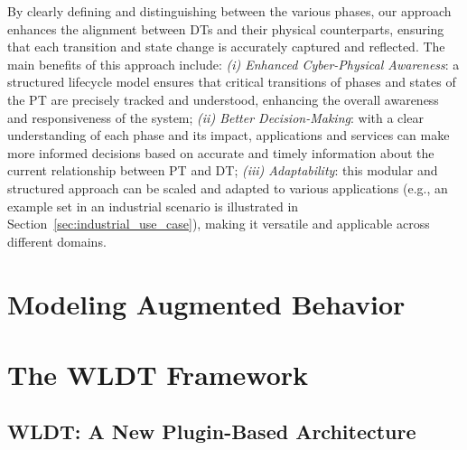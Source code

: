 By clearly defining and distinguishing between the various phases, our approach enhances the alignment between DTs and their physical counterparts, ensuring that each transition and state change is accurately captured and reflected. The main benefits of this approach include: 
\textit{(i) Enhanced Cyber-Physical Awareness}: a structured lifecycle model ensures that critical transitions of phases and states of the PT are precisely tracked and understood, enhancing the overall awareness and responsiveness of the system;
\textit{(ii) Better Decision-Making}: with a clear understanding of each phase and its impact, applications and services can make more informed decisions based on accurate and timely information about the current relationship between PT and DT;
\textit{(iii) Adaptability}: this modular and structured approach can be scaled and adapted to various applications (e.g., an example set in an industrial scenario is illustrated in Section~\ref{sec:industrial_use_case}), making it versatile and applicable across different domains.




\section{Modeling Augmented Behavior}


\section{The \acl{WLDT} Framework}




\subsection{WLDT: A New Plugin-Based Architecture} 
\label{sec:wldt-architecture}


